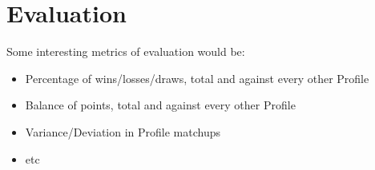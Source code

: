 \documentclass{acmart}
\begin{document}
\section{Evaluation}
Some interesting metrics of evaluation would be:
\begin{itemize}
\item Percentage of wins/losses/draws, total and against every other Profile
\item Balance of points, total and against every other Profile
\item Variance/Deviation in Profile matchups
\item etc
\end{itemize}


\end{document}
